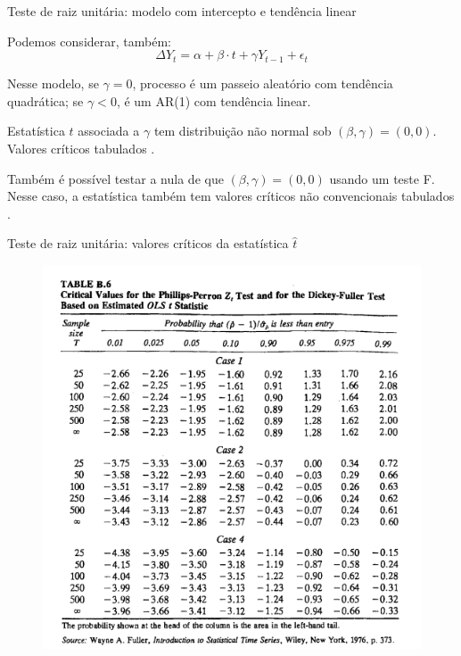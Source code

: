 \documentclass[11pt]{beamer}
\newenvironment{wideitemize}{\itemize\addtolength{\itemsep}{10pt}}{\enditemize}
\newenvironment{halfwideitemize}{\itemize\addtolength{\itemsep}{0.5em}}{\enditemize}
\begin{document}
\begin{frame}{Teste de raiz unitária: modelo com intercepto e tendência linear}
	\begin{wideitemize}
		\item Podemos considerar, também:
		\begin{equation}
			\label{eq_trend}
			\Delta Y_t = \alpha + \beta \cdot t + \gamma Y_{t-1} + \epsilon_t
		\end{equation}
		\begin{halfwideitemize}
			\item Nesse modelo, se $\gamma = 0$, processo é um passeio aleatório com tendência quadrática; se $\gamma < 0$, é um AR(1) com tendência linear.
			\item Estatística $t$ associada a $\gamma$ tem distribuição não normal sob $(\beta, \gamma) = (0,0)$. Valores críticos tabulados \citep{Dickey1981}.
			\item Também é possível testar a nula de que $(\beta,\gamma) =(0,0)$ usando um teste F. Nesse caso, a estatística também tem valores críticos não convencionais tabulados \citep{Dickey1981}.
		\end{halfwideitemize}
	\end{wideitemize}
\end{frame}
\begin{frame}{Teste de raiz unitária: valores críticos da estatística $\hat{t}$}
	\begin{figure}
		\includegraphics[scale=0.4]{graficos/valores_criticos_t.png}
	\end{figure}
\end{frame}
\end{document}
